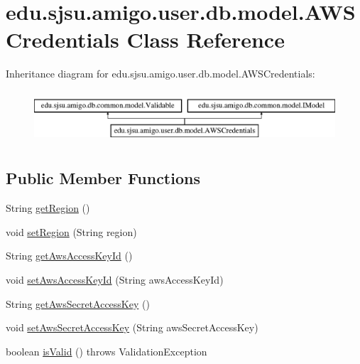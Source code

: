 \hypertarget{classedu_1_1sjsu_1_1amigo_1_1user_1_1db_1_1model_1_1_a_w_s_credentials}{}\section{edu.\+sjsu.\+amigo.\+user.\+db.\+model.\+A\+W\+S\+Credentials Class Reference}
\label{classedu_1_1sjsu_1_1amigo_1_1user_1_1db_1_1model_1_1_a_w_s_credentials}
Inheritance diagram for edu.\+sjsu.\+amigo.\+user.\+db.\+model.\+A\+W\+S\+Credentials\+:\begin{figure}[H]
\begin{center}
\leavevmode
\includegraphics[height=1.971831cm]{classedu_1_1sjsu_1_1amigo_1_1user_1_1db_1_1model_1_1_a_w_s_credentials}
\end{center}
\end{figure}
\subsection*{Public Member Functions}
\begin{DoxyCompactItemize}
\item 
String \hyperlink{classedu_1_1sjsu_1_1amigo_1_1user_1_1db_1_1model_1_1_a_w_s_credentials_a82b6d2fb07a08ed943e255aac25275f0}{get\+Region} ()
\item 
void \hyperlink{classedu_1_1sjsu_1_1amigo_1_1user_1_1db_1_1model_1_1_a_w_s_credentials_a206ac8db04865ca99863e949098e04e3}{set\+Region} (String region)
\item 
String \hyperlink{classedu_1_1sjsu_1_1amigo_1_1user_1_1db_1_1model_1_1_a_w_s_credentials_aa5d5b05aa2ebc0cd33f5d504a461a026}{get\+Aws\+Access\+Key\+Id} ()
\item 
void \hyperlink{classedu_1_1sjsu_1_1amigo_1_1user_1_1db_1_1model_1_1_a_w_s_credentials_a7ad5857273c93876b9c93e35de329c5f}{set\+Aws\+Access\+Key\+Id} (String aws\+Access\+Key\+Id)
\item 
String \hyperlink{classedu_1_1sjsu_1_1amigo_1_1user_1_1db_1_1model_1_1_a_w_s_credentials_a4451dc59e5d102e5adf08e0294b47dca}{get\+Aws\+Secret\+Access\+Key} ()
\item 
void \hyperlink{classedu_1_1sjsu_1_1amigo_1_1user_1_1db_1_1model_1_1_a_w_s_credentials_ab6ba6620a3a74547bfc540e163996372}{set\+Aws\+Secret\+Access\+Key} (String aws\+Secret\+Access\+Key)
\item 
boolean \hyperlink{classedu_1_1sjsu_1_1amigo_1_1user_1_1db_1_1model_1_1_a_w_s_credentials_a91c2a5b381a09082e0d584e46b0071a0}{is\+Valid} ()  throws Validation\+Exception 
\end{DoxyCompactItemize}
